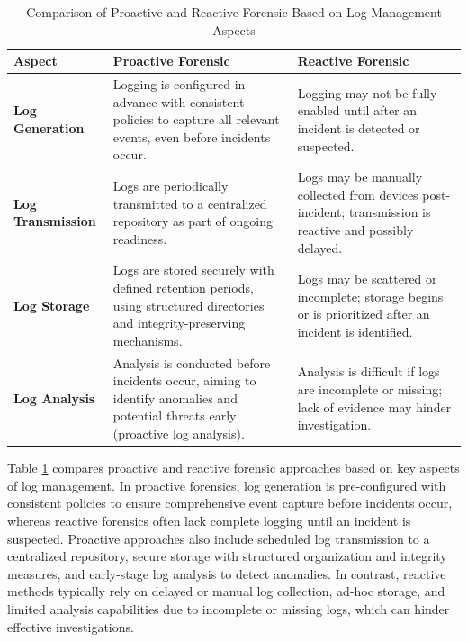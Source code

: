 \begin{table}[H]
\centering
\caption{Comparison of Proactive and Reactive Forensic Based on Log Management Aspects}
\label{tab:forensic-log-comparison}
\begin{tabular}{|p{4cm}|p{5.5cm}|p{5.5cm}|}
\hline
\textbf{Aspect} & \textbf{Proactive Forensic} & \textbf{Reactive Forensic} \\
\hline
\textbf{Log Generation} & Logging is configured in advance with consistent policies to capture all relevant events, even before incidents occur. & Logging may not be fully enabled until after an incident is detected or suspected. \\
\hline
\textbf{Log Transmission} & Logs are periodically transmitted to a centralized repository as part of ongoing readiness. & Logs may be manually collected from devices post-incident; transmission is reactive and possibly delayed. \\
\hline
\textbf{Log Storage} & Logs are stored securely with defined retention periods, using structured directories and integrity-preserving mechanisms. & Logs may be scattered or incomplete; storage begins or is prioritized after an incident is identified. \\
\hline
\textbf{Log Analysis} & Analysis is conducted before incidents occur, aiming to identify anomalies and potential threats early (proactive log analysis). & Analysis is difficult if logs are incomplete or missing; lack of evidence may hinder investigation. \\
\hline
\end{tabular}
\end{table}


Table \ref{tab:forensic-log-comparison} compares proactive and reactive forensic approaches based on key aspects of log management. In proactive forensics, log generation is pre-configured with consistent policies to ensure comprehensive event capture before incidents occur, whereas reactive forensics often lack complete logging until an incident is suspected. Proactive approaches also include scheduled log transmission to a centralized repository, secure storage with structured organization and integrity measures, and early-stage log analysis to detect anomalies. In contrast, reactive methods typically rely on delayed or manual log collection, ad-hoc storage, and limited analysis capabilities due to incomplete or missing logs, which can hinder effective investigations.


